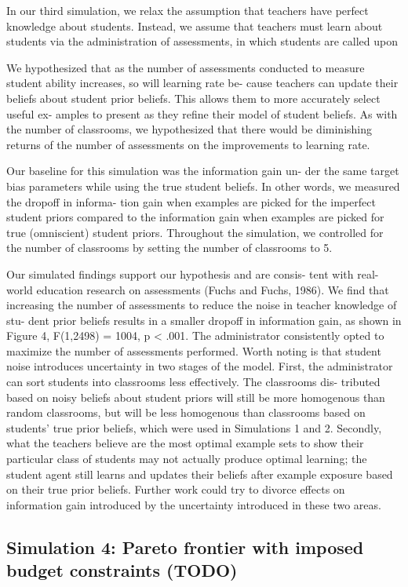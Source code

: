 \documentclass[10pt, letterpaper]{article}
\begin{document}
In our third simulation, we relax the assumption that teachers have
perfect knowledge about students. Instead, we assume that teachers must
learn about students via the administration of assessments, in which
students are called upon

We hypothesized that as the number of assessments conducted to measure
student ability increases, so will learning rate be- cause teachers can
update their beliefs about student prior beliefs. This allows them to
more accurately select useful ex- amples to present as they refine their
model of student beliefs. As with the number of classrooms, we
hypothesized that there would be diminishing returns of the number of
assessments on the improvements to learning rate.

Our baseline for this simulation was the information gain un- der the
same target bias parameters while using the true student beliefs. In
other words, we measured the dropoff in informa- tion gain when examples
are picked for the imperfect student priors compared to the information
gain when examples are picked for true (omniscient) student priors.
Throughout the simulation, we controlled for the number of classrooms by
setting the number of classrooms to 5.

Our simulated findings support our hypothesis and are consis- tent with
real-world education research on assessments (Fuchs and Fuchs, 1986). We
find that increasing the number of assessments to reduce the noise in
teacher knowledge of stu- dent prior beliefs results in a smaller
dropoff in information gain, as shown in Figure 4, F(1,2498) = 1004, p
\textless{} .001. The administrator consistently opted to maximize the
number of assessments performed. Worth noting is that student noise
introduces uncertainty in two stages of the model. First, the
administrator can sort students into classrooms less effectively. The
classrooms dis- tributed based on noisy beliefs about student priors
will still be more homogenous than random classrooms, but will be less
homogenous than classrooms based on students' true prior beliefs, which
were used in Simulations 1 and 2. Secondly, what the teachers believe
are the most optimal example sets to show their particular class of
students may not actually produce optimal learning; the student agent
still learns and updates their beliefs after example exposure based on
their true prior beliefs. Further work could try to divorce effects on
information gain introduced by the uncertainty introduced in these two
areas.

\subsection{Simulation 4: Pareto frontier with imposed budget
constraints
(TODO)}\label{simulation-4-pareto-frontier-with-imposed-budget-constraints-todo}
\end{document}
